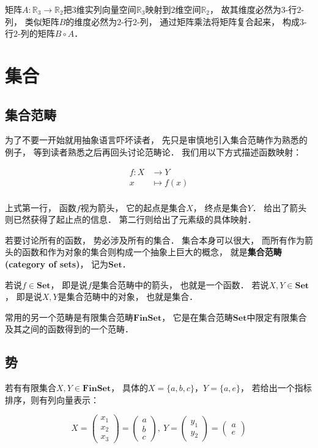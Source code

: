 \documentclass[10pt, openany]{book}
\begin{document}
矩阵$A: \mathbb R_3 \to \mathbb R_2$把$3$维实列向量空间$\mathbb R_3$映射到$2$维空间$\mathbb R_2$，
故其维度必然为$3$-行$2$-列，
类似矩阵$B$的维度必然为$2$-行$2$-列，
通过矩阵乘法将矩阵复合起来，
构成$3$-行$2$-列的矩阵$B \circ A$．


\chapter{集合}

\section{集合范畴}

为了不要一开始就用抽象语言吓坏读者，
先只是审慎地引入集合范畴作为熟悉的例子，
等到读者熟悉之后再回头讨论范畴论．
我们用以下方式描述函数映射：

$$
\begin{aligned}
f: X &\to Y \\
x &\mapsto f(x) \\
\end{aligned}
$$

上式第一行，
函数$f$视为箭头，
它的起点是集合$X$，
终点是集合$Y$．
给出了箭头则已然获得了起止点的信息．
第二行则给出了元素级的具体映射．

若要讨论所有的函数，
势必涉及所有的集合．
集合本身可以很大，
而所有作为箭头的函数和作为对象的集合则构成一个抽象上巨大的概念，
就是\textbf{集合范畴(category of sets)}，
记为$\mathbf{Set}$．

若说$f\in\mathbf{Set}$，
即是说$f$是集合范畴中的箭头，
也就是一个函数．
若说$X,Y\in\mathbf{Set}$，
即是说$X,Y$是集合范畴中的对象，
也就是集合．

常用的另一个范畴是有限集合范畴$\mathbf{FinSet}$，
它是在集合范畴$\mathbf{Set}$中限定有限集合及其之间的函数得到的一个范畴．

\section{势}

若有有限集合$X,Y\in\mathbf{FinSet}$，
具体的$X = \{a,b,c\}$，$Y=\{a,e\}$，
若给出一个指标排序，则有列向量表示：

$$
X=\begin{pmatrix}x_1 \\ x_2 \\ x_3\end{pmatrix}=\begin{pmatrix}a \\ b \\ c\end{pmatrix},\ 
Y=\begin{pmatrix}y_1 \\ y_2\end{pmatrix}=\begin{pmatrix}a \\ e\end{pmatrix}
$$
\end{document}
